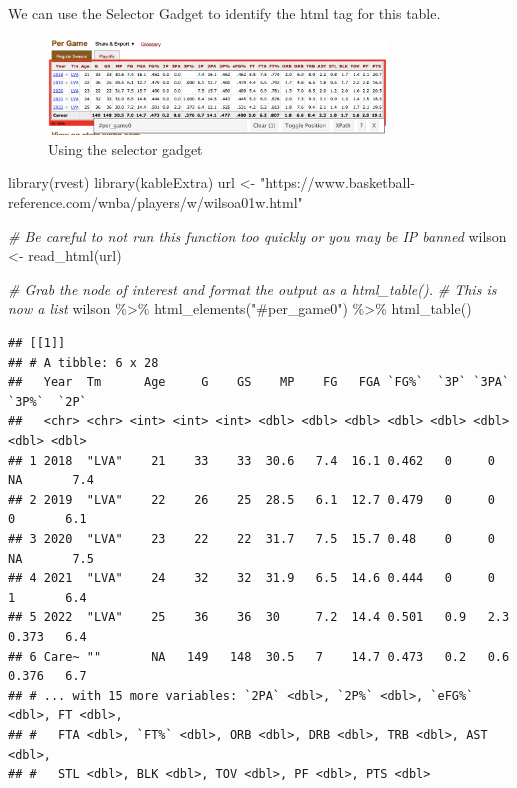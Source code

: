\documentclass[
  11pt,
]{book}
\newenvironment{Shaded}{\begin{snugshade}}{\end{snugshade}}
\newcommand{\CommentTok}[1]{\textcolor[rgb]{0.56,0.35,0.01}{\textit{#1}}}
\newcommand{\FunctionTok}[1]{\textcolor[rgb]{0.00,0.00,0.00}{#1}}
\newcommand{\NormalTok}[1]{#1}
\newcommand{\OtherTok}[1]{\textcolor[rgb]{0.56,0.35,0.01}{#1}}
\newcommand{\SpecialCharTok}[1]{\textcolor[rgb]{0.00,0.00,0.00}{#1}}
\newcommand{\StringTok}[1]{\textcolor[rgb]{0.31,0.60,0.02}{#1}}
\theoremstyle{definition}
\theoremstyle{definition}
\theoremstyle{definition}
\theoremstyle{definition}
\theoremstyle{remark}
\begin{document}
We can use the Selector Gadget to identify the html tag for this table.

\begin{figure}
\centering
\includegraphics[width=0.8\textwidth,height=\textheight]{images/wilson-scrape2.png}
\caption{Using the selector gadget}
\end{figure}

\begin{Shaded}
\begin{Highlighting}[]
\FunctionTok{library}\NormalTok{(rvest)}
\FunctionTok{library}\NormalTok{(kableExtra)}
\NormalTok{url }\OtherTok{\textless{}{-}} \StringTok{"https://www.basketball{-}reference.com/wnba/players/w/wilsoa01w.html"}

\CommentTok{\# Be careful to not run this function too quickly or you may be IP banned}
\NormalTok{wilson }\OtherTok{\textless{}{-}} \FunctionTok{read\_html}\NormalTok{(url)}
\end{Highlighting}
\end{Shaded}

\begin{Shaded}
\begin{Highlighting}[]
\CommentTok{\# Grab the node of interest and format the output as a html\_table(). }
\CommentTok{\# This is now a list}
\NormalTok{wilson }\SpecialCharTok{\%\textgreater{}\%} 
  \FunctionTok{html\_elements}\NormalTok{(}\StringTok{"\#per\_game0"}\NormalTok{) }\SpecialCharTok{\%\textgreater{}\%} 
  \FunctionTok{html\_table}\NormalTok{()}
\end{Highlighting}
\end{Shaded}

\begin{verbatim}
## [[1]]
## # A tibble: 6 x 28
##   Year  Tm      Age     G    GS    MP    FG   FGA `FG%`  `3P` `3PA`  `3P%`  `2P`
##   <chr> <chr> <int> <int> <int> <dbl> <dbl> <dbl> <dbl> <dbl> <dbl>  <dbl> <dbl>
## 1 2018  "LVA"    21    33    33  30.6   7.4  16.1 0.462   0     0   NA       7.4
## 2 2019  "LVA"    22    26    25  28.5   6.1  12.7 0.479   0     0    0       6.1
## 3 2020  "LVA"    23    22    22  31.7   7.5  15.7 0.48    0     0   NA       7.5
## 4 2021  "LVA"    24    32    32  31.9   6.5  14.6 0.444   0     0    1       6.4
## 5 2022  "LVA"    25    36    36  30     7.2  14.4 0.501   0.9   2.3  0.373   6.4
## 6 Care~ ""       NA   149   148  30.5   7    14.7 0.473   0.2   0.6  0.376   6.7
## # ... with 15 more variables: `2PA` <dbl>, `2P%` <dbl>, `eFG%` <dbl>, FT <dbl>,
## #   FTA <dbl>, `FT%` <dbl>, ORB <dbl>, DRB <dbl>, TRB <dbl>, AST <dbl>,
## #   STL <dbl>, BLK <dbl>, TOV <dbl>, PF <dbl>, PTS <dbl>
\end{verbatim}
\end{document}
